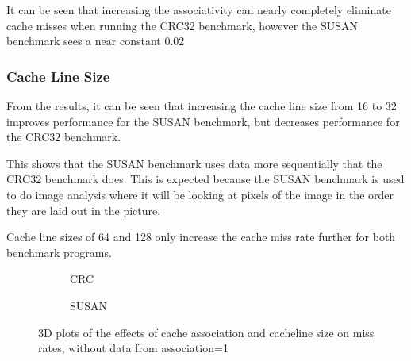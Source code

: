 It can be seen that increasing the associativity can nearly completely eliminate
cache misses when running the CRC32 benchmark, however the SUSAN benchmark sees a near
constant 0.02%

\subsubsection{Cache Line Size}

From the results, it can be seen that increasing the cache line size from 16 to 32
improves performance for the SUSAN benchmark, but decreases performance for the CRC32
benchmark.

This shows that the SUSAN benchmark uses data more sequentially that the CRC32 benchmark
does.
This is expected because the SUSAN benchmark is used to do image analysis where it will be
looking at pixels of the image in the order they are laid out in the picture.

Cache line sizes of 64 and 128 only increase the cache miss rate further for
both benchmark programs.

\begin{figure}[H]%
\hfill%
\begin{subfigure}{.4\textwidth}
    \centering
    
    \caption{CRC}
    \label{fig:partb-2d-crc}
\end{subfigure}%
\hfill%
\begin{subfigure}{.4\textwidth}
    \centering
    
    \caption{SUSAN}
    \label{fig:partb-2d-susan}
\end{subfigure}%
\hfill\null%
\caption{3D plots of the effects of cache association and cacheline size on miss rates, without data from association=1}
\end{figure}
